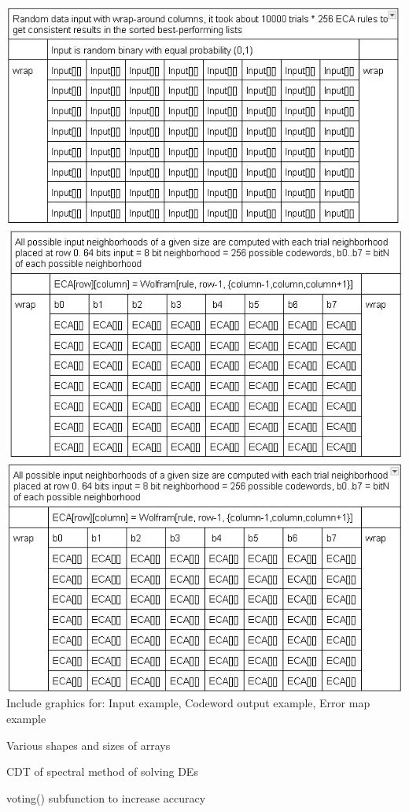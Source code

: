 \documentclass[11pt]{article}
\begin{document}
\includegraphics{WrappedInput}\\
\includegraphics{ECAspace}\\
\includegraphics{ErrorScore}\\
Include graphics for: Input example, Codeword output example, Error map example

Various shapes and sizes of arrays


CDT of spectral method of solving DEs

voting() subfunction to increase accuracy



\end{document}
